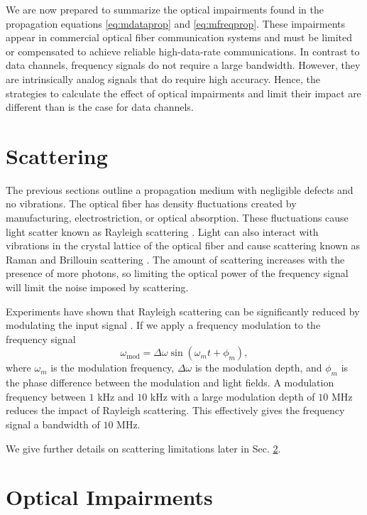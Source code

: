 We are now prepared to summarize the optical impairments found in the propagation equations \ref{eq:mdataprop} and \ref{eq:mfreqprop}. These impairments appear in commercial optical fiber communication systems and must be limited or compensated to achieve reliable high-data-rate communications. In contrast to data channels, frequency signals do not require a large bandwidth. However, they are intrinsically analog signals that do require high accuracy. Hence, the strategies to calculate the effect of optical impairments and limit their impact are different than is the case for data channels.

\section{Scattering} \label{sec:scattering}

The previous sections outline a propagation medium with negligible defects and no vibrations. The optical fiber has density fluctuations created by manufacturing, electrostriction, or optical absorption. These fluctuations cause light scatter known as Rayleigh scattering \cite{Boyd2003}. Light can also interact with vibrations in the crystal lattice of the optical fiber and cause scattering known as Raman and Brillouin scattering \cite{Boyd2003}. The amount of scattering increases with the presence of more photons, so limiting the optical power of the frequency signal will limit the noise imposed by scattering.

Experiments have shown that Rayleigh scattering can be significantly reduced by modulating the input signal \cite{Okusaga:13}. If we apply a frequency modulation to the frequency signal
%
\begin{equation}
	\label{eq:modulation}
	\omega_{\text{mod}} = \Delta\omega\sin(\omega_mt + \phi_m),
\end{equation}
%
where $\omega_m$ is the modulation frequency, $\Delta\omega$ is the modulation depth, and $\phi_m$ is the phase difference between the modulation and light fields\cite{menyukIFCS2015}. A modulation frequency between $1$ kHz and $10$ kHz with a large modulation depth of $10$ MHz reduces the impact of Rayleigh scattering\cite{menyukIFCS2015}. This effectively gives the frequency signal a bandwidth of $10$ MHz.

We give further details on scattering limitations later in Sec. \ref{sec:impair}.

\section{Optical Impairments} \label{sec:impair}

